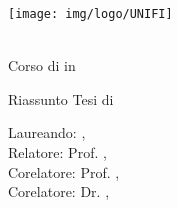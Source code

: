 
\begin{center}

\texttt{[image: img/logo/UNIFI]}

\small

\myFaculty \\
Corso di \myDegreeLevel in \myDegree \\
\myYear

\medskip

\begingroup \color{Maroon}
Riassunto Tesi di \myDegreeLevel \\
\spacedallcaps{\myItalianTitle} 
\endgroup

\medskip

Laureando: \textit{\myName}, \myMail \\
Relatore: Prof. \textit{\myProf}, \myProfMail \\
Corelatore: Prof. \textit{\myCorelatore}, \myCorelatoreMail \\ 
Corelatore:	Dr. \textit{\myOtherCorelatore}, \myOtherCorelatoreMail

\end{center}

